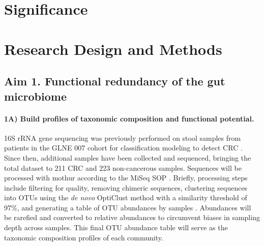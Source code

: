 \documentclass[11pt]{article}
\begin{document}
\section*{Significance} %


\section*{Research Design and Methods}

\subsection*{Aim 1. Functional redundancy of the gut microbiome}

\paragraph{1A) Build profiles of taxonomic composition and functional potential.}

16S rRNA gene sequencing was previously performed on stool samples from patients in the GLNE 007 cohort for classification modeling to detect CRC \cite{baxter_microbiota-based_2016}.
Since then, additional samples have been collected and sequenced, bringing the total dataset to 211 CRC and 223 non-cancerous samples.
Sequences will be processed with mothur according to the MiSeq SOP \cite{schloss_introducing_2009, kozich_development_2013}.
Briefly, processing steps include filtering for quality, removing chimeric sequences, clustering sequences into OTUs using the \textit{de novo} OptiClust method with a similarity threshold of 97\%,
and generating a table of OTU abundances by samples \cite{westcott_opticlust_2017}.
Abundances will be rarefied and converted to relative abundances to circumvent biases in sampling depth across samples.
This final OTU abundance table will serve as the taxonomic composition profiles of each community.
\end{document}
